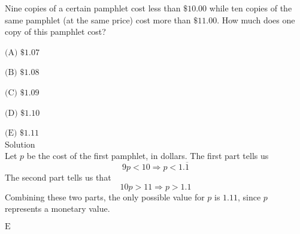 

Nine copies of a certain pamphlet cost less than $\$ 10.00$ while ten copies of the same pamphlet (at the same price) cost more than $\$ 11.00$. How much does one copy of this pamphlet cost?

$\text{(A)}$ $\$1.07$

$\text{(B)}$ $\$1.08$

$\text{(C)}$ $\$1.09$

$\text{(D)}$ $\$1.10$

$\text{(E)}$ $\$1.11$
\\
Solution
\\
Let $p$ be the cost of the first pamphlet, in dollars. The first part tells us \[9p<10 \Rightarrow p<1.\overline{1}\]
The second part tells us that \[10p>11\Rightarrow p>1.1\]
Combining these two parts, the only possible value for $p$ is $1.11$, since $p$ represents a monetary value.

$\boxed{\text{E}}$
